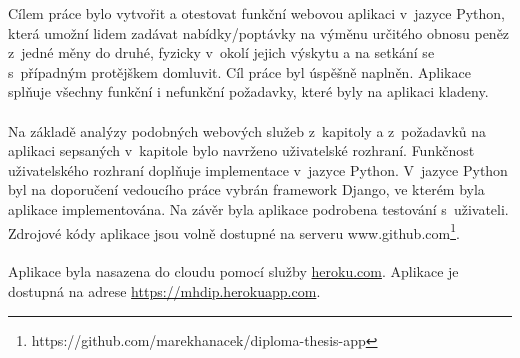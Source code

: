 \begin{conclusion}
Cílem práce bylo vytvořit a otestovat funkční webovou aplikaci v~jazyce Python, která umožní lidem zadávat nabídky/poptávky na výměnu určitého obnosu peněz z~jedné měny do druhé, fyzicky v~okolí jejich výskytu a na setkání se s~případným protějškem domluvit. Cíl práce byl úspěšně naplněn. Aplikace splňuje všechny funkční i nefunkční požadavky, které byly na aplikaci kladeny.
\\\\
Na základě analýzy podobných webových služeb z~kapitoly \textit{} a z~požadavků na aplikaci sepsaných v~kapitole \textit{} bylo navrženo uživatelské rozhraní. Funkčnost uživatelského rozhraní doplňuje implementace v~jazyce Python. V~jazyce Python byl na doporučení vedoucího práce vybrán framework Django, ve kterém byla aplikace implementována. Na závěr byla aplikace podrobena testování s~uživateli. Zdrojové kódy aplikace jsou volně dostupné na serveru www.github.com\footnote{https://github.com/marekhanacek/diploma-thesis-app}.
\\\\
Aplikace byla nasazena do cloudu pomocí služby \url{heroku.com}\cite{heroku}. Aplikace je dostupná na adrese \url{https://mhdip.herokuapp.com}.
\end{conclusion}